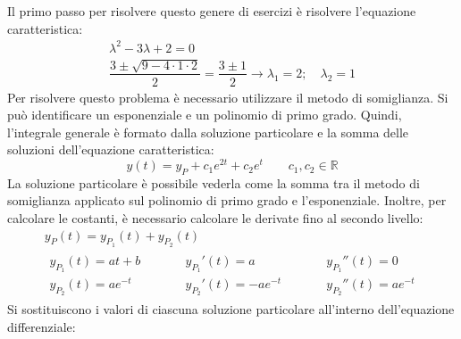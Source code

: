 \documentclass[a4paper]{article}
\begin{document}
	\noindent
	Il primo passo per risolvere questo genere di esercizi è risolvere l'equazione caratteristica:
	\begin{gather*}
		\lambda^{2} - 3\lambda + 2 = 0 \\
		\dfrac{3 \pm \sqrt{9 - 4 \cdot 1 \cdot 2}}{2} = \dfrac{3 \pm 1}{2} \longrightarrow \lambda_{1} = 2; \hspace{1em} \lambda_{2} = 1
	\end{gather*}
	Per risolvere questo problema è necessario utilizzare il metodo di somiglianza. Si può identificare un esponenziale e un polinomio di primo grado. Quindi, l'integrale generale è formato dalla soluzione particolare e la somma delle soluzioni dell'equazione caratteristica:
	\begin{equation*}
		y\left(t\right) = y_{P} + c_{1}e^{2t} + c_{2}e^{t} \hspace{2em} c_{1}, c_{2} \in \mathbb{R}
	\end{equation*}
	La soluzione particolare è possibile vederla come la somma tra il metodo di somiglianza applicato sul polinomio di primo grado e l'esponenziale. Inoltre, per calcolare le costanti, è necessario calcolare le derivate fino al secondo livello:
	\begin{gather*}
		y_{P}\left(t\right) = y_{P_{1}}\left(t\right) + y_{P_{2}}\left(t\right) \\
		\begin{array}{lclcl}
			y_{P_{1}}\left(t\right) = at + b   &\hspace{2em}&
			y_{P_{1}}'\left(t\right) = a 	   &\hspace{2em}&
			y_{P_{1}}''\left(t\right) = 0 \\ [.5em]
			y_{P_{2}}\left(t\right) = ae^{-t}  		&\hspace{2em}&
			y_{P_{2}}'\left(t\right) = -ae^{-t} 	&\hspace{2em}&
			y_{P_{2}}''\left(t\right) = ae^{-t} 
		\end{array}
	\end{gather*}
	Si sostituiscono i valori di ciascuna soluzione particolare all'interno dell'equazione differenziale:
\end{document}
